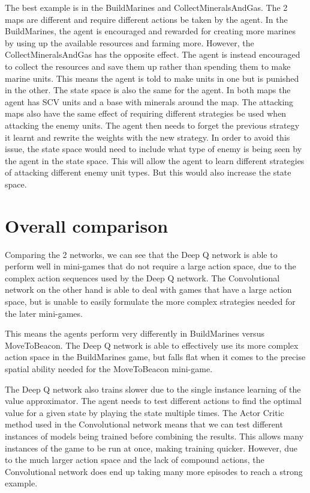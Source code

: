 The best example is in the BuildMarines and CollectMineralsAndGas. The 2 maps
are different and require different actions be taken by the agent. In the
BuildMarines, the agent is encouraged and rewarded for creating more marines by
using up the available resources and farming more. However, the
CollectMineralsAndGas has the opposite effect. The agent is instead encouraged
to collect the resources and save them up rather than spending them to make
marine units. This means the agent is told to make units in one but is punished
in the other. The state space is also the same for the agent. In both maps the
agent has SCV units and a base with minerals around the map. The attacking maps
also have the same effect of requiring different strategies be used when
attacking the enemy units. The agent then needs to forget the previous strategy
it learnt and rewrite the weights with the new strategy. In order to avoid this
issue, the state space would need to include what type of enemy is being seen by
the agent in the state space. This will allow the agent to learn different
strategies of attacking different enemy unit types. But this would also increase
the state space.

\section{Overall comparison}

Comparing the 2 networks, we can see that the Deep Q network is able to perform
well in mini-games that do not require a large action space, due to the complex
action sequences used by the Deep Q network. The Convolutional network on the
other hand is able to deal with games that have a large action space, but is
unable to easily formulate the more complex strategies needed for the later
mini-games.

This means the agents perform very differently in BuildMarines versus MoveToBeacon.
The Deep Q network is able to effectively use its more complex action space in
the BuildMarines game, but falls flat when it comes to the precise spatial
ability needed for the MoveToBeacon mini-game.

The Deep Q network also trains slower due to the single instance learning of the
value approximator. The agent needs to test different actions to find the
optimal value for a given state by playing the state multiple times. The Actor
Critic method used in the Convolutional network means that we can test different
instances of models being trained before combining the results. This allows many
instances of the game to be run at once, making training quicker. However, due
to the much larger action space and the lack of compound actions, the
Convolutional network does end up taking many more episodes to reach a strong
example.

